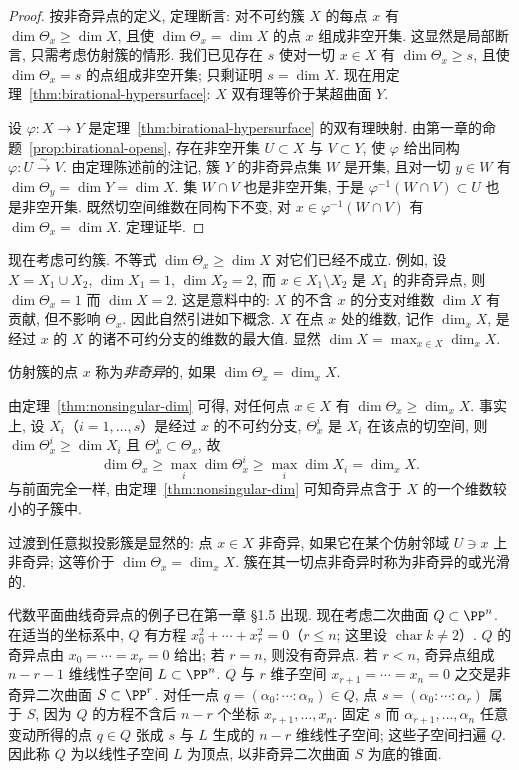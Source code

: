 \begin{proof}
	按非奇异点的定义, 定理断言: 对不可约簇 $X$ 的每点 $x$ 有 $\dim \Theta_x \ge \dim X$, 且使 $\dim \Theta_x = \dim X$ 的点 $x$ 组成非空开集. 这显然是局部断言, 只需考虑仿射簇的情形. 我们已见存在 $s$ 使对一切 $x \in X$ 有 $\dim \Theta_x \ge s$, 且使 $\dim \Theta_x = s$ 的点组成非空开集; 只剩证明 $s = \dim X$. 现在用定理~\ref{thm:birational-hypersurface}: $X$ 双有理等价于某超曲面 $Y$.

	设 $\varphi: X \to Y$ 是定理~\ref{thm:birational-hypersurface} 的双有理映射. 由第一章的命题~\ref{prop:birational-opens}, 存在非空开集 $U \subset X$ 与 $V \subset Y$, 使 $\varphi$ 给出同构 $\varphi: U \overset{\sim}{\to} V$. 由定理陈述前的注记, 簇 $Y$ 的非奇异点集 $W$ 是开集, 且对一切 $y \in W$ 有 $\dim \Theta_y = \dim Y = \dim X$. 集 $W \cap V$ 也是非空开集, 于是 $\varphi^{-1}(W \cap V) \subset U$ 也是非空开集. 既然切空间维数在同构下不变, 对 $x \in \varphi^{-1}(W \cap V)$ 有 $\dim \Theta_x = \dim X$. 定理证毕.
\end{proof}

现在考虑可约簇. 不等式 $\dim \Theta_x \ge \dim X$ 对它们已经不成立. 例如, 设 $X = X_1 \cup X_2$, $\dim X_1 = 1$, $\dim X_2 = 2$, 而 $x \in X_1 \setminus X_2$ 是 $X_1$ 的非奇异点, 则 $\dim \Theta_x = 1$ 而 $\dim X = 2$. 这是意料中的: $X$ 的不含 $x$ 的分支对维数 $\dim X$ 有贡献, 但不影响 $\Theta_x$. 因此自然引进如下概念. $X$ 在点 $x$ 处的维数, 记作 $\dim_x X$, 是经过 $x$ 的 $X$ 的诸不可约分支的维数的最大值. 显然 $\dim X = \max_{x \in X} \dim_x X$.

\begin{definition}[可约簇的非奇异点]\label{def:nonsingular-reducible}
	仿射簇的点 $x$ 称为\emph{非奇异}的, 如果 $\dim \Theta_x = \dim_x X$.
\end{definition}

由定理~\ref{thm:nonsingular-dim} 可得, 对任何点 $x \in X$ 有 $\dim \Theta_x \ge \dim_x X$. 事实上, 设 $X_i$（$i = 1, \ldots, s$）是经过 $x$ 的不可约分支, $\Theta_x^i$ 是 $X_i$ 在该点的切空间, 则 $\dim \Theta_x^i \ge \dim X_i$ 且 $\Theta_x^i \subset \Theta_x$, 故
\[
	\dim \Theta_x \ge \max_i \dim \Theta_x^i \ge \max_i \dim X_i = \dim_x X.
\]
与前面完全一样, 由定理~\ref{thm:nonsingular-dim} 可知奇异点含于 $X$ 的一个维数较小的子簇中.

过渡到任意拟投影簇是显然的: 点 $x \in X$ 非奇异, 如果它在某个仿射邻域 $U \ni x$ 上非奇异; 这等价于 $\dim \Theta_x = \dim_x X$. 簇在其一切点非奇异时称为非奇异的或光滑的.

代数平面曲线奇异点的例子已在第一章 §1.5 出现. 现在考虑二次曲面 $Q \subset \PP^n$. 在适当的坐标系中, $Q$ 有方程 $x_0^2 + \cdots + x_r^2 = 0$（$r \le n$; 这里设 $\operatorname{char} k \ne 2$）. $Q$ 的奇异点由 $x_0 = \cdots = x_r = 0$ 给出; 若 $r = n$, 则没有奇异点. 若 $r < n$, 奇异点组成 $n - r - 1$ 维线性子空间 $L \subset \PP^n$. $Q$ 与 $r$ 维子空间 $x_{r+1} = \cdots = x_n = 0$ 之交是非奇异二次曲面 $S \subset \PP^r$. 对任一点 $q = (\alpha_0 : \cdots : \alpha_n) \in Q$, 点 $s = (\alpha_0 : \cdots : \alpha_r)$ 属于 $S$, 因为 $Q$ 的方程不含后 $n - r$ 个坐标 $x_{r+1}, \ldots, x_n$. 固定 $s$ 而 $\alpha_{r+1}, \ldots, \alpha_n$ 任意变动所得的点 $q \in Q$ 张成 $s$ 与 $L$ 生成的 $n - r$ 维线性子空间; 这些子空间扫遍 $Q$. 因此称 $Q$ 为以线性子空间 $L$ 为顶点, 以非奇异二次曲面 $S$ 为底的锥面.

